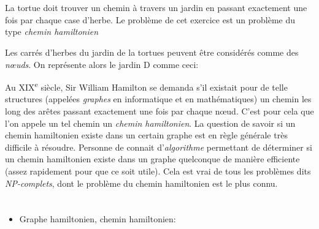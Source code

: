 {{%
\section*{\BrochureItsInformatics}
La tortue doit trouver un chemin à travers un jardin en passant exactement une fois par chaque case d’herbe. Le problème de cet exercice est un problème du type \emph{chemin hamiltonien}

Les carrés d’herbes du jardin de la tortues peuvent être considérés comme des \emph{nœuds}. On représente alors le jardin D comme ceci:

{\centering%
\par}

Au XIX\textsuperscript{e} siècle, Sir William Hamilton se demanda s’il existait pour de telle structures (appelées \emph{graphes} en informatique et en mathématiques) un chemin les long des arêtes passant exactement une fois par chaque nœud. C’est pour cela que l’on appele un tel chemin un \emph{chemin hamiltonien}. La question de savoir si un chemin hamiltonien existe dans un certain graphe est en règle générale très difficile à résoudre. Personne de connait d’\emph{algorithme} permettant de déterminer si un chemin hamiltonien existe dans un graphe quelconque de manière efficiente (assez rapidement pour que ce soit utile). Cela est vrai de tous les problèmes dits \emph{NP-complets}, dont le problème du chemin hamiltonien est le plus connu.



\section*{\BrochureWebsitesAndKeywords}
{\raggedright
\begin{itemize}
  \item Graphe hamiltonien, chemin hamiltonien: \href{https://fr.wikipedia.org/wiki/Graphe_hamiltonien}{}
\end{itemize}


}

}{}

\def\AuthorPohlW{} %
\def\AuthorGulbaharY{} %
\def\AuthorDatzkoS{} %
\def\AuthorBaumannL{} %
\def\AuthorFreiF{} %
\def\AuthorPelletE{} %

\newpage}{}
